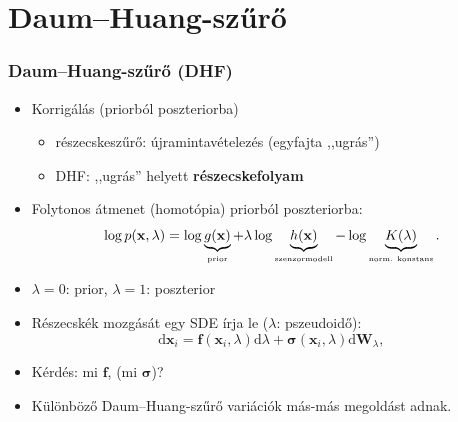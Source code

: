 \documentclass{beamer}
\begin{document}
\section[Daum--Huang-szűrő]{Daum--Huang-szűrő}
\begin{frame}
    \frametitle{Daum--Huang-szűrő (DHF)}
    \begin{itemize}
        \item<1-> Korrigálás (priorból poszteriorba)
        \begin{itemize}
            \item részecskeszűrő: újramintavételezés (egyfajta ,,ugrás'')
            \item DHF: ,,ugrás'' helyett \textbf{részecskefolyam}
        \end{itemize}
        \item<2-> Folytonos átmenet (homotópia) priorból poszteriorba:
        \begin{equation}\label{eq:bayes-loghom}
            \log p(\mathbf{x},\lambda) = \log \underbrace{g(\mathbf{x})}_{\text{\tiny{prior}}} + \lambda \log \underbrace{h(\mathbf{x})}_{\text{\tiny{szenzormodell}}} - \log \underbrace{K(\lambda)}_{\text{\tiny{norm. konstans}}}. \nonumber
        \end{equation}
        \item<2-> $\lambda = 0$: prior, $\lambda = 1$: poszterior
        \item<3-> Részecskék mozgását egy SDE írja le ($\lambda$: pszeudoidő):
        \begin{equation}
            \mathrm{d} \mathbf{x}_i=\mathbf{f}(\mathbf{x}_i, \lambda) \mathrm{d} \lambda+\boldsymbol{\sigma}(\mathbf{x}_i, \lambda) \mathrm{d} \mathbf{W}_{\lambda},
        \end{equation}
        \item<4-> Kérdés: mi $\mathbf{f}$, (mi $\boldsymbol{\sigma}$)?
        \item<4-> Különböző Daum--Huang-szűrő variációk más-más megoldást adnak.
    \end{itemize}
\end{frame}
\end{document}
